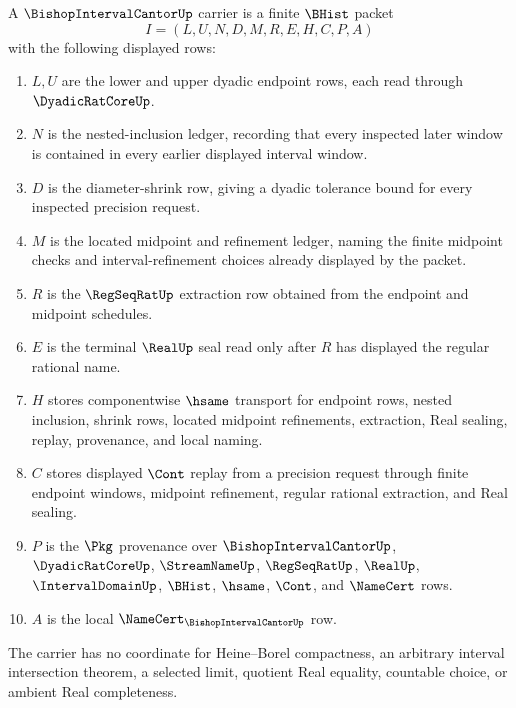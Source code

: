 \begin{definition}
\label{def:bishop-interval-cantor-carrier}
A $\BishopIntervalCantorUp$ carrier is a finite $\BHist$ packet
$$
I=(L,U,N,D,M,R,E,H,C,P,A)
$$
with the following displayed rows:
\begin{enumerate}
\item $L,U$ are the lower and upper dyadic endpoint rows, each read through $\DyadicRatCoreUp$.
\item $N$ is the nested-inclusion ledger, recording that every inspected later window is contained in every earlier displayed interval window.
\item $D$ is the diameter-shrink row, giving a dyadic tolerance bound for every inspected precision request.
\item $M$ is the located midpoint and refinement ledger, naming the finite midpoint checks and interval-refinement choices already displayed by the packet.
\item $R$ is the $\RegSeqRatUp$ extraction row obtained from the endpoint and midpoint schedules.
\item $E$ is the terminal $\RealUp$ seal read only after $R$ has displayed the regular rational name.
\item $H$ stores componentwise $\hsame$ transport for endpoint rows, nested inclusion, shrink rows, located midpoint refinements, extraction, Real sealing, replay, provenance, and local naming.
\item $C$ stores displayed $\Cont$ replay from a precision request through finite endpoint windows, midpoint refinement, regular rational extraction, and Real sealing.
\item $P$ is the $\Pkg$ provenance over $\BishopIntervalCantorUp$, $\DyadicRatCoreUp$, $\StreamNameUp$, $\RegSeqRatUp$, $\RealUp$, $\IntervalDomainUp$, $\BHist$, $\hsame$, $\Cont$, and $\NameCert$ rows.
\item $A$ is the local $\NameCert_{\BishopIntervalCantorUp}$ row.
\end{enumerate}
The carrier has no coordinate for Heine--Borel compactness, an arbitrary interval intersection theorem, a selected limit, quotient Real equality, countable choice, or ambient Real completeness.
\end{definition}

